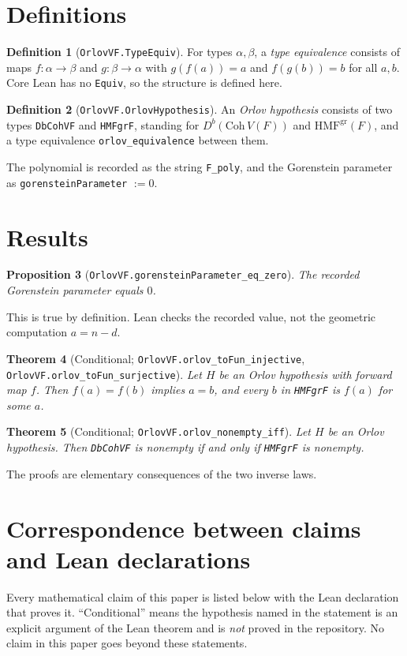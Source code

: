\documentclass[11pt]{amsart}
\newtheorem{theorem}{Theorem}[section]
\newtheorem{proposition}[theorem]{Proposition}
\theoremstyle{definition}
\newtheorem{definition}[theorem]{Definition}
\theoremstyle{remark}
\begin{document}
\section{Definitions}
\begin{definition}[\texttt{OrlovVF.TypeEquiv}]
For types $\alpha,\beta$, a \emph{type equivalence} consists of maps $f:\alpha\to\beta$ and $g:\beta\to\alpha$ with $g(f(a))=a$ and $f(g(b))=b$ for all $a,b$. Core Lean has no \texttt{Equiv}, so the structure is defined here.
\end{definition}
\begin{definition}[\texttt{OrlovVF.OrlovHypothesis}]
An \emph{Orlov hypothesis} consists of two types \texttt{DbCohVF} and \texttt{HMFgrF}, standing for $D^b(\mathrm{Coh}\,V(F))$ and $\mathrm{HMF}^{\mathrm{gr}}(F)$, and a type equivalence \texttt{orlov\_equivalence} between them.
\end{definition}
The polynomial is recorded as the string \texttt{F\_poly}, and the Gorenstein parameter as \texttt{gorensteinParameter} $:=0$.

\section{Results}
\begin{proposition}[\texttt{OrlovVF.gorensteinParameter\_eq\_zero}]
The recorded Gorenstein parameter equals $0$.
\end{proposition}
This is true by definition. Lean checks the recorded value, not the geometric computation $a=n-d$.
\begin{theorem}[Conditional; \texttt{OrlovVF.orlov\_toFun\_injective}, \texttt{OrlovVF.orlov\_toFun\_surjective}]
Let $H$ be an Orlov hypothesis with forward map $f$. Then $f(a)=f(b)$ implies $a=b$, and every $b$ in \texttt{HMFgrF} is $f(a)$ for some $a$.
\end{theorem}
\begin{theorem}[Conditional; \texttt{OrlovVF.orlov\_nonempty\_iff}]
Let $H$ be an Orlov hypothesis. Then \texttt{DbCohVF} is nonempty if and only if \texttt{HMFgrF} is nonempty.
\end{theorem}
The proofs are elementary consequences of the two inverse laws.

\section{Correspondence between claims and Lean declarations}\label{sec:table}
Every mathematical claim of this paper is listed below with the Lean declaration that proves it. ``Conditional'' means the hypothesis named in the statement is an explicit argument of the Lean theorem and is \emph{not} proved in the repository. No claim in this paper goes beyond these statements.
\end{document}
